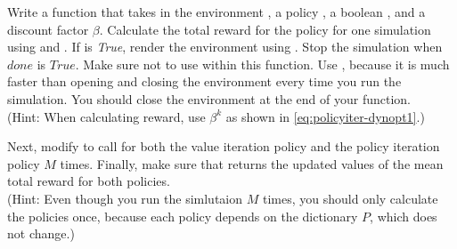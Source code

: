 \begin{problem}
\label{prob:policyiter-value6}
Write a function  that takes in the environment , a policy , a boolean , and a discount factor $\beta$.
Calculate the total reward for the policy for one simulation using  and .
If  is \emph{True}, render the environment using .
Stop the simulation when $done$ is $True$.
Make sure not to use  within this function. 
Use , because it is much faster than opening and closing the environment every time you run the simulation.
You should close the environment at the end of your  function.
\\(Hint: When calculating reward, use $\beta^k$ as shown in \ref{eq:policyiter-dynopt1}.)

Next, modify  to call  for both the value iteration policy and the policy iteration policy $M$ times. 
Finally, make sure that  returns the updated values of the mean total reward for both policies.
\\(Hint: Even though you run the simlutaion $M$ times, you should only calculate the policies once, because each policy depends on the dictionary $P$, which does not change.)
\end{problem}


